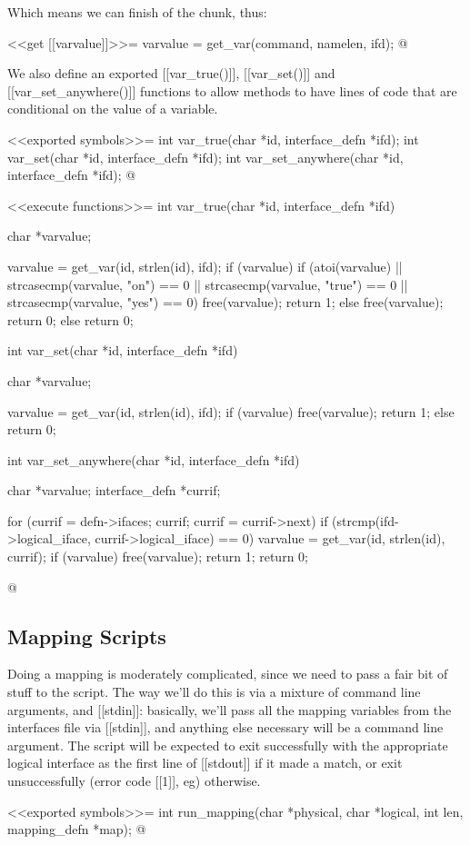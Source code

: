 \documentclass{article}
\begin{document}
Which means we can finish of the chunk, thus:

<<get [[varvalue]]>>=
varvalue = get_var(command, namelen, ifd);
@ 

We also define an exported [[var_true()]], [[var_set()]] and [[var_set_anywhere()]] functions
to allow methods to have lines of code that are conditional on the value
of a variable.

<<exported symbols>>=
int var_true(char *id, interface_defn *ifd);
int var_set(char *id, interface_defn *ifd);
int var_set_anywhere(char *id, interface_defn *ifd);
@

<<execute functions>>=
int var_true(char *id, interface_defn *ifd) {
	char *varvalue;

	varvalue = get_var(id, strlen(id), ifd);
	if (varvalue) {
		if (atoi(varvalue) ||
			strcasecmp(varvalue, "on") == 0 ||
			strcasecmp(varvalue, "true") == 0 ||
			strcasecmp(varvalue, "yes") == 0)
		{
			free(varvalue);
			return 1;
		} else {
			free(varvalue);
			return 0;
		}
	} else
		return 0;
}

int var_set(char *id, interface_defn *ifd) {
	char *varvalue;

	varvalue = get_var(id, strlen(id), ifd);
	if (varvalue) {
		free(varvalue);
		return 1;
	} else {
		return 0;
	}
}

int var_set_anywhere(char *id, interface_defn *ifd) {
	char *varvalue;
	interface_defn *currif;

	for (currif = defn->ifaces; currif; currif = currif->next) {
		if (strcmp(ifd->logical_iface, currif->logical_iface) == 0) {
			varvalue = get_var(id, strlen(id), currif);
			if (varvalue) {
				free(varvalue);
				return 1;
			}
		}
	}
	return 0;
}
@

\subsection{Mapping Scripts}

Doing a mapping is moderately complicated, since we need to pass a
fair bit of stuff to the script. The way we'll do this is via a
mixture of command line arguments, and [[stdin]]: basically, we'll
pass all the mapping variables from the interfaces file via [[stdin]],
and anything else necessary will be a command line argument. The
script will be expected to exit successfully with the appropriate
logical interface as the first line of [[stdout]] if it made a match,
or exit unsuccessfully (error code [[1]], eg) otherwise.

<<exported symbols>>=
int run_mapping(char *physical, char *logical, int len, mapping_defn *map);
@ 
\end{document}
